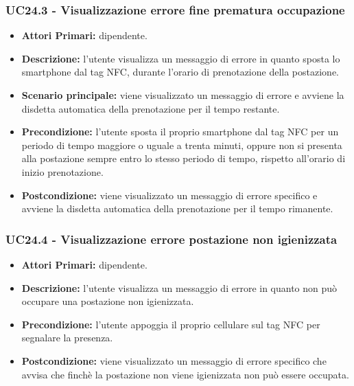 \subsubsection{ UC24.3 - Visualizzazione errore fine prematura occupazione}
\begin{itemize}
	\item\textbf{Attori Primari:} dipendente.
	\item\textbf{Descrizione:} l’utente visualizza un messaggio di errore in quanto sposta lo smartphone dal tag NFC, durante l'orario di prenotazione della postazione.
	\item\textbf{Scenario principale:} viene visualizzato un messaggio di errore e avviene la disdetta automatica della prenotazione per il tempo restante.
	\item\textbf{Precondizione:} l’utente sposta il proprio smartphone dal tag NFC per un periodo di tempo maggiore o uguale a trenta minuti, oppure non si presenta alla postazione sempre entro lo stesso periodo di tempo, rispetto all'orario di inizio prenotazione. 
	\item\textbf{Postcondizione:} viene visualizzato un messaggio di errore specifico e avviene la disdetta automatica della prenotazione per il tempo rimanente.
\end{itemize}

\subsubsection{ UC24.4 - Visualizzazione errore postazione non igienizzata}
\begin{itemize}
	\item\textbf{Attori Primari:} dipendente.
	\item\textbf{Descrizione:} l’utente visualizza un messaggio di errore in quanto non può occupare una postazione non igienizzata.
	\item\textbf{Precondizione:} l’utente appoggia il proprio cellulare sul tag NFC per segnalare la presenza. 
	\item\textbf{Postcondizione:} viene visualizzato un messaggio di errore specifico che avvisa che finchè la postazione non viene igienizzata non può essere occupata.
\end{itemize}

